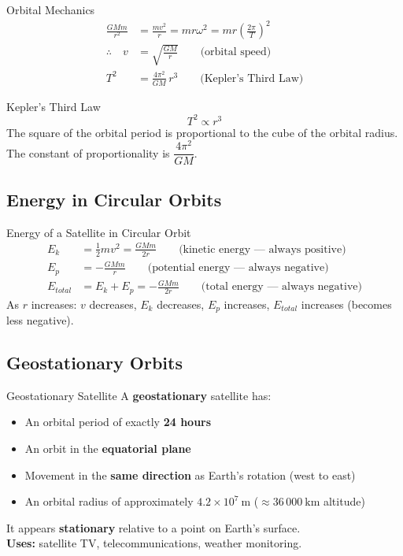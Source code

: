 \begin{formulabox}{Orbital Mechanics}
\begin{align*}
\frac{GMm}{r^2} &= \frac{mv^2}{r} = mr\omega^2 = mr\left(\frac{2\pi}{T}\right)^2 \\[1em]
\therefore\quad v &= \sqrt{\frac{GM}{r}} \qquad \text{(orbital speed)}\\[0.8em]
T^2 &= \frac{4\pi^2}{GM}\,r^3 \qquad \text{(Kepler's Third Law)}
\end{align*}
\end{formulabox}

\begin{keybox}{Kepler's Third Law}
$$T^2 \propto r^3$$
The square of the orbital period is proportional to the cube of the orbital radius. The constant of proportionality is $\dfrac{4\pi^2}{GM}$.
\end{keybox}

\subsection{Energy in Circular Orbits}

\begin{formulabox}{Energy of a Satellite in Circular Orbit}
\begin{align*}
E_k &= \frac{1}{2}mv^2 = \frac{GMm}{2r} \qquad \text{(kinetic energy — always positive)}\\
E_p &= -\frac{GMm}{r} \qquad \text{(potential energy — always negative)}\\
E_{total} &= E_k + E_p = -\frac{GMm}{2r} \qquad \text{(total energy — always negative)}
\end{align*}
As $r$ increases: $v$ decreases, $E_k$ decreases, $E_p$ increases, $E_{total}$ increases (becomes less negative).
\end{formulabox}

\subsection{Geostationary Orbits}

\begin{definitionbox}{Geostationary Satellite}
A \textbf{geostationary} satellite has:
\begin{itemize}[itemsep=2pt]
  \item An orbital period of exactly \textbf{24 hours}
  \item An orbit in the \textbf{equatorial plane}
  \item Movement in the \textbf{same direction} as Earth's rotation (west to east)
  \item An orbital radius of approximately $4.2 \times 10^7\ \text{m}$ ($\approx 36\,000\ \text{km}$ altitude)
\end{itemize}
It appears \textbf{stationary} relative to a point on Earth's surface.\\[0.3em]
\textbf{Uses:} satellite TV, telecommunications, weather monitoring.
\end{definitionbox}

